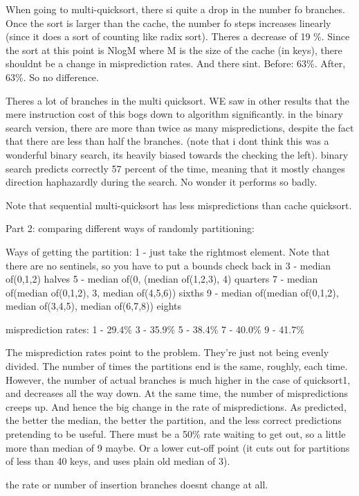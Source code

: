 When going to multi-quicksort, there si quite a drop in the number fo branches.
Once the sort is larger than the cache, the number fo steps increases linearly
(since it does a sort of counting like radix sort). Theres a decrease of 19 \%.
Since the sort at this point is NlogM where M is the size of the cache (in
keys), there shouldnt be a change in misprediction rates. And there sint.
Before: 63\%. After, 63\%. So no difference.

Theres a lot of branches in the multi quicksort. WE saw in other results that
the mere instruction cost of this bogs down to algorithm significantly. in the
binary search version, there are more than twice as many mispredictions,
despite the fact that there are less than half the branches. (note that i dont
think this was a wonderful binary search, its heavily biased towards the
checking the left). binary search predicts correctly 57 percent of the time,
meaning that it mostly changes direction haphazardly during the search. No
wonder it performs so badly.

Note that sequential multi-quicksort has less mispredictions than cache quicksort.

Part 2: comparing different ways of randomly partitioning:

Ways of getting the partition:
1 - just take the rightmost element. Note that there are no sentinels, so you have to put a bounds check back in
3 - median of(0,1,2) halves
5 - median of(0, (median of(1,2,3), 4) quarters
7 - median of(median of(0,1,2), 3, median of(4,5,6)) sixths
9 - median of(median of(0,1,2), median of(3,4,5), median of(6,7,8)) eights

misprediction rates:
1 - 29.4\%
3 - 35.9\%
5 - 38.4\%
7 - 40.0\%
9 - 41.7\%

The misprediction rates point to the problem. They're just not being evenly divided. The number of times the partitions end is the same, roughly, each time. However, the number of actual branches is much higher in the case of quicksort1, and decreases all the way down. At the same time, the number of mispredictions creeps up. And hence the big change in the rate of mispredictions. As predicted, the better the median, the better the partition, and the less correct predictions pretending to be useful. There must be a 50\% rate waiting to get out, so a little more than median of 9 maybe. Or a lower cut-off point (it cuts out for partitions of less than 40 keys, and uses plain old median of 3).

the rate or number of insertion branches doesnt change at all.


